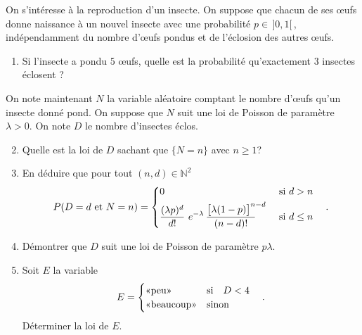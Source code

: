 \documentclass[12pt,reqno]{amsart}
\begin{document}
\tsvp
\begin{exo}

On s'intéresse à la reproduction d'un insecte. On suppose que chacun de ses  œufs donne naissance à un nouvel insecte avec une probabilité $p \in \,]0,1[$\,, indépendamment du nombre d'œufs pondus et de l'éclosion des autres œufs.
\begin{enumerate}
 \item Si l'insecte a pondu $5$ œufs, quelle est la probabilité qu'exactement $3$ insectes éclosent ?
\end{enumerate}

 On note maintenant $ N$ la variable aléatoire comptant le nombre d'œufs qu'un insecte donné pond. On suppose que $N$ suit une loi de Poisson de paramètre $\lambda>0$.  On note $D$ le nombre d'insectes éclos.
  \begin{enumerate}\setcounter{enumi}{1}
  \item Quelle est la loi de $D$ sachant que $\{N=n\}$ avec $n\ge 1$?

    \item En déduire que pour tout $(n, d)\in\mathbb{N}^2$
      $$
        P(D = d \text{ et } N = n)=
          \begin{dcases}
            0 & \text{ si } d>n \\
            \frac{(\lambda p)^d}{d!}
            ~e^{-\lambda}\,
            \frac{\big[\lambda (1-p)\big]^{\makebox[4pt][l]{$\scriptstyle n-d$}}}{(n-d)!}\quad
              & \text{ si } d\le n
          \end{dcases}\quad.
      $$

    \item Démontrer que $D$ suit une loi de Poisson de paramètre $p\lambda$.

    \item Soit $E$ la variable
      $$
        E=
          \begin{cases}
            \text{«peu»} & \text{si\quad} D < 4\\
            \text{«beaucoup»} & \text{sinon}
          \end{cases}\quad.
      $$
      Déterminer la loi de $E$.

  \end{enumerate}

\end{exo}
\end{document}
